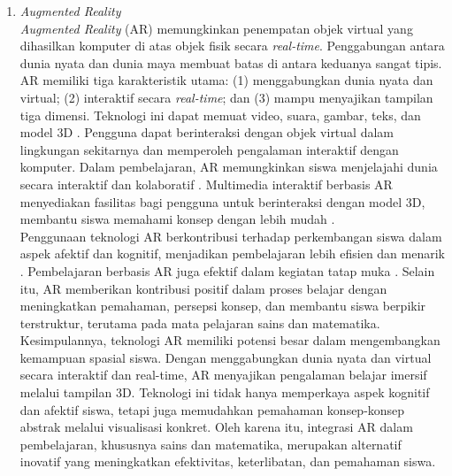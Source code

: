 \begin{enumerate}
\begin{enumerate}
        \item Konsekuensi dari berbagai bentuk pengajaran (baik yang bersifat positif maupun negatif).
    \end{enumerate}
    \hspace*{1cm}Dari uraian tersebut dapat disimpulkan bahwa pendidikan matematika memiliki peran penting dalam membentuk pola pikir, meningkatkan kualitas pembelajaran serta mendukung perkembangan ilmu pengetahuan dan teknologi. Keberhasilan pendidikan matematika bergantung pada keseimbangan antara pemahaman konsep teoritis dan penerapannya dalam konteks nyata. Dengan pendekatan dan pemahaman yang tepat, pendidikan matematika dapat berkontribusi dalam menciptakan pembelajaran bermakna dan berkelanjutan.

    \item \textit{Augmented Reality}\\
    \hspace*{1cm}\textit{Augmented Reality} (AR) memungkinkan penempatan objek virtual yang dihasilkan komputer di atas objek fisik secara \textit{real-time}. Penggabungan antara dunia nyata dan dunia maya membuat batas di antara keduanya sangat tipis. AR memiliki tiga karakteristik utama: (1) menggabungkan dunia nyata dan virtual; (2) interaktif secara \textit{real-time}; dan (3) mampu menyajikan tampilan tiga dimensi. Teknologi ini dapat memuat video, suara, gambar, teks, dan model 3D \citep{tekedere2016}. Pengguna dapat berinteraksi dengan objek virtual dalam lingkungan sekitarnya dan memperoleh pengalaman interaktif dengan komputer. Dalam pembelajaran, AR memungkinkan siswa menjelajahi dunia secara interaktif dan kolaboratif \citep{antonioli2014}. Multimedia interaktif berbasis AR menyediakan fasilitas bagi pengguna untuk berinteraksi dengan model 3D, membantu siswa memahami konsep dengan lebih mudah \citep{martin2010}.\\
    \hspace*{1cm}Penggunaan teknologi AR berkontribusi terhadap perkembangan siswa dalam aspek afektif dan kognitif, menjadikan pembelajaran lebih efisien dan menarik \citep{tomi2013}. Pembelajaran berbasis AR juga efektif dalam kegiatan tatap muka \citep{lin2013}. Selain itu, AR memberikan kontribusi positif dalam proses belajar dengan meningkatkan pemahaman, persepsi konsep, dan membantu siswa berpikir terstruktur, terutama pada mata pelajaran sains dan matematika.\\
    \hspace*{1cm}Kesimpulannya, teknologi AR memiliki potensi besar dalam mengembangkan kemampuan spasial siswa. Dengan menggabungkan dunia nyata dan virtual secara interaktif dan real-time, AR menyajikan pengalaman belajar imersif melalui tampilan 3D. Teknologi ini tidak hanya memperkaya aspek kognitif dan afektif siswa, tetapi juga memudahkan pemahaman konsep-konsep abstrak melalui visualisasi konkret. Oleh karena itu, integrasi AR dalam pembelajaran, khususnya sains dan matematika, merupakan alternatif inovatif yang meningkatkan efektivitas, keterlibatan, dan pemahaman siswa.


\end{enumerate}
